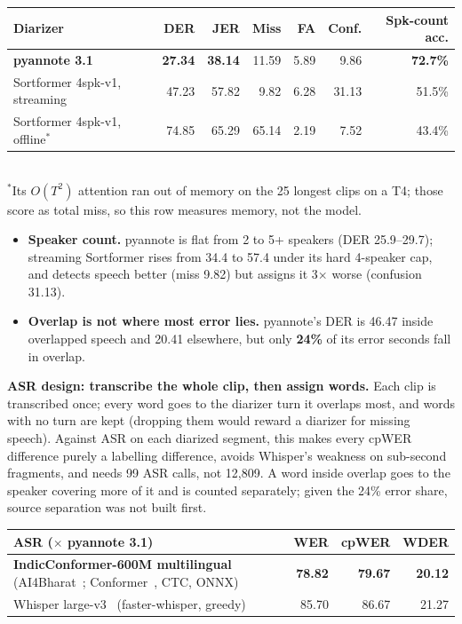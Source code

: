 \documentclass[10pt]{article}
\newcommand{\x}{$\times$}
\begin{document}
\begin{center}\footnotesize
\begin{tabular}{@{}lrrrrrr@{}}
\toprule
Diarizer & DER & JER & Miss & FA & Conf. & Spk-count acc.\\
\midrule
\textbf{pyannote 3.1}~\citep{bredin2023pyannote,plaquet2023powerset} & \textbf{27.34} & \textbf{38.14} & 11.59 & 5.89 & 9.86 & \textbf{72.7\%}\\
Sortformer 4spk-v1, streaming~\citep{park2024sortformer} & 47.23 & 57.82 & 9.82 & 6.28 & 31.13 & 51.5\%\\
Sortformer 4spk-v1, offline$^{*}$ & 74.85 & 65.29 & 65.14 & 2.19 & 7.52 & 43.4\%\\
\bottomrule
\end{tabular}\\[2pt]
{\footnotesize $^{*}$Its $O(T^2)$ attention ran out of memory on the 25 longest clips on a T4; those score as total miss,
so this row measures memory, not the model.}
\end{center}

\begin{itemize}
  \item \textbf{Speaker count.} pyannote is flat from 2 to 5+ speakers (DER 25.9--29.7); streaming Sortformer rises from
        34.4 to 57.4 under its hard 4-speaker cap, and detects speech better (miss 9.82) but assigns it 3\x{} worse (confusion 31.13).
  \item \textbf{Overlap is not where most error lies.} pyannote's DER is 46.47 inside overlapped speech and 20.41
        elsewhere, but only \textbf{24\%} of its error seconds fall in overlap.
\end{itemize}

\textbf{ASR design: transcribe the whole clip, then assign words.} Each clip is transcribed once; every word goes to
the diarizer turn it overlaps most, and words with no turn are kept (dropping them would reward a diarizer for missing
speech). Against ASR on each diarized segment, this makes every cpWER difference purely a labelling difference, avoids
Whisper's weakness on sub-second fragments, and needs 99 ASR calls, not 12{,}809. A word inside overlap goes to the
speaker covering more of it and is counted separately; given the 24\% error share, source separation was not built first.

\begin{center}\footnotesize
\begin{tabular}{@{}lrrr@{}}
\toprule
ASR (\x{} pyannote 3.1) & WER & cpWER & WDER\\
\midrule
\textbf{IndicConformer-600M multilingual} (AI4Bharat~\citep{javed2024indicvoices}; Conformer~\citep{gulati2020conformer}, CTC, ONNX) & \textbf{78.82} & \textbf{79.67} & \textbf{20.12}\\
Whisper large-v3~\citep{radford2023whisper} (faster-whisper, greedy) & 85.70 & 86.67 & 21.27\\
\bottomrule
\end{tabular}
\end{center}
\end{document}

